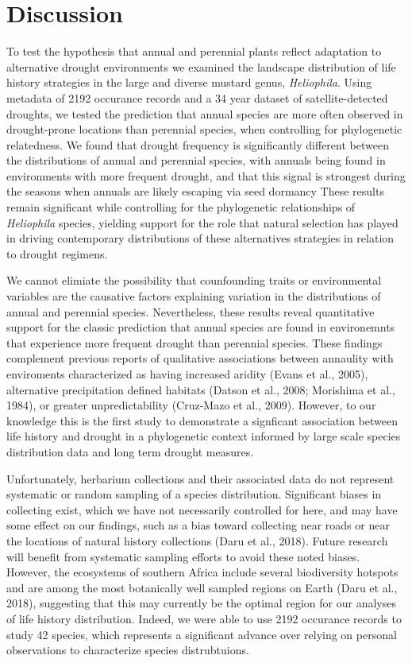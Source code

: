 \documentclass[man,floatsintext]{apa6}
\theoremstyle{definition}
\theoremstyle{definition}
\theoremstyle{definition}
\theoremstyle{remark}
\begin{document}
\hypertarget{discussion}{%
\section{Discussion}\label{discussion}}

To test the hypothesis that annual and perennial plants reflect
adaptation to alternative drought environments we examined the landscape
distribution of life history strategies in the large and diverse mustard
genus, \emph{Heliophila}. Using metadata of 2192 occurance records and a
34 year dataset of satellite-detected droughts, we tested the prediction
that annual species are more often observed in drought-prone locations
than perennial species, when controlling for phylogenetic relatedness.
We found that drought frequency is significantly different between the
distributions of annual and perennial species, with annuals being found
in environments with more frequent drought, and that this signal is
strongest during the seasons when annuals are likely escaping via seed
dormancy These results remain significant while controlling for the
phylogenetic relationships of \emph{Heliophila} species, yielding
support for the role that natural selection has played in driving
contemporary distributions of these alternatives strategies in relation
to drought regimens.

We cannot elimiate the possibility that counfounding traits or
environmental variables are the causative factors explaining variation
in the distributions of annual and perennial species. Nevertheless,
these results reveal quantitative support for the classic prediction
that annual species are found in environemnts that experience more
frequent drought than perennial species. These findings complement
previous reports of qualitative associations between annaulity with
enviroments characterized as having increased aridity (Evans et al.,
2005), alternative precipitation defined habitats (Datson et al., 2008;
Morishima et al., 1984), or greater unpredictability (Cruz-Mazo et al.,
2009). However, to our knowledge this is the first study to demonstrate
a signficant association between life history and drought in a
phylogenetic context informed by large scale species distribution data
and long term drought measures.

Unfortunately, herbarium collections and their associated data do not
represent systematic or random sampling of a species distribution.
Significant biases in collecting exist, which we have not necessarily
controlled for here, and may have some effect on our findings, such as a
bias toward collecting near roads or near the locations of natural
history collections (Daru et al., 2018). Future research will benefit
from systematic sampling efforts to avoid these noted biases. However,
the ecosystems of southern Africa include several biodiversity hotspots
and are among the most botanically well sampled regions on Earth (Daru
et al., 2018), suggesting that this may currently be the optimal region
for our analyses of life history distribution. Indeed, we were able to
use 2192 occurance records to study 42 species, which represents a
significant advance over relying on personal observations to
characterize species distrubtuions.
\end{document}
